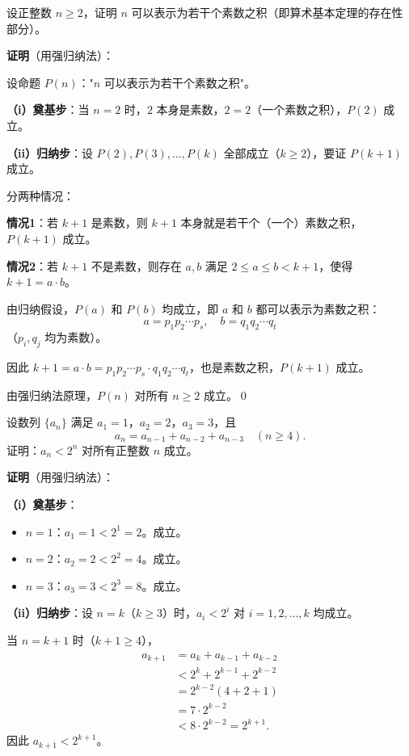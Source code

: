 \documentclass[12pt, a4paper]{ctexart}
\begin{document}
\begin{examplebox}[【例题6】用强归纳法证明]
设正整数 $n \geq 2$，证明 $n$ 可以表示为若干个素数之积（即算术基本定理的存在性部分）。
\end{examplebox}

\textbf{证明}（用强归纳法）：

设命题 $P(n)$："$n$ 可以表示为若干个素数之积"。

\textbf{（i）奠基步}：当 $n=2$ 时，$2$ 本身是素数，$2 = 2$（一个素数之积），$P(2)$ 成立。

\textbf{（ii）归纳步}：设 $P(2), P(3), \ldots, P(k)$ 全部成立（$k \geq 2$），要证 $P(k+1)$ 成立。

分两种情况：

\textbf{情况1}：若 $k+1$ 是素数，则 $k+1$ 本身就是若干个（一个）素数之积，$P(k+1)$ 成立。

\textbf{情况2}：若 $k+1$ 不是素数，则存在 $a, b$ 满足 $2 \leq a \leq b < k+1$，使得 $k+1 = a \cdot b$。

由归纳假设，$P(a)$ 和 $P(b)$ 均成立，即 $a$ 和 $b$ 都可以表示为素数之积：
\[ a = p_1 p_2 \cdots p_s, \quad b = q_1 q_2 \cdots q_t \]
（$p_i, q_j$ 均为素数）。

因此 $k+1 = a \cdot b = p_1 p_2 \cdots p_s \cdot q_1 q_2 \cdots q_t$，也是素数之积，$P(k+1)$ 成立。

由强归纳法原理，$P(n)$ 对所有 $n \geq 2$ 成立。\qed

\begin{examplebox}[【例题7】用强归纳法证明递推关系]
设数列 $\{a_n\}$ 满足 $a_1 = 1$，$a_2 = 2$，$a_3 = 3$，且
\[ a_n = a_{n-1} + a_{n-2} + a_{n-3} \quad (n \geq 4). \]
证明：$a_n < 2^n$ 对所有正整数 $n$ 成立。
\end{examplebox}

\textbf{证明}（用强归纳法）：

\textbf{（i）奠基步}：
\begin{itemize}
  \item $n=1$：$a_1 = 1 < 2^1 = 2$。成立。
  \item $n=2$：$a_2 = 2 < 2^2 = 4$。成立。
  \item $n=3$：$a_3 = 3 < 2^3 = 8$。成立。
\end{itemize}

\textbf{（ii）归纳步}：设 $n = k$（$k \geq 3$）时，$a_i < 2^i$ 对 $i = 1, 2, \ldots, k$ 均成立。

当 $n = k+1$ 时（$k+1 \geq 4$），
\begin{align*}
a_{k+1} &= a_k + a_{k-1} + a_{k-2} \\
&< 2^k + 2^{k-1} + 2^{k-2} \\
&= 2^{k-2}(4 + 2 + 1) \\
&= 7 \cdot 2^{k-2} \\
&< 8 \cdot 2^{k-2} = 2^{k+1}.
\end{align*}
因此 $a_{k+1} < 2^{k+1}$。
\end{document}
